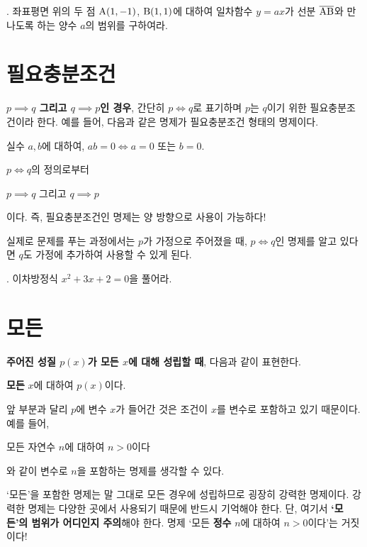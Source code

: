 \bigskip

\ex. 좌표평면 위의 두 점 \(\rm{A}(1, -1)\), \(\rm{B}(1, 1)\)에 대하여 일차함수 \(y = ax\)가 선분 \(\overline{\rm{AB}}\)와 만나도록 하는 양수 \(a\)의 범위를 구하여라.

\pagebreak

\section{필요충분조건}

\textbf{\(p \implies q\) 그리고 \(q \implies p\)인 경우}, 간단히 \(p \iff q\)로 표기하며 \(p\)는 \(q\)이기 위한 필요충분조건이라 한다. 예를 들어, 다음과 같은 명제가 필요충분조건 형태의 명제이다.
\begin{center}
    실수 \(a, b\)에 대하여, \(ab = 0 \iff a = 0\) 또는 \(b = 0\).
\end{center}

\(p \iff q\)의 정의로부터
\begin{center}
    \(p \implies q\) 그리고 \(q \implies p\)
\end{center}
이다. 즉, 필요충분조건인 명제는 양 방향으로 사용이 가능하다!

실제로 문제를 푸는 과정에서는 \(p\)가 가정으로 주어졌을 때, \(p \iff q\)인 명제를 알고 있다면 \(q\)도 가정에 추가하여 사용할 수 있게 된다.

\bigskip

\ex. 이차방정식 \(x^2 + 3x + 2 = 0\)을 풀어라.

\pagebreak

\section{모든}

\textbf{주어진 성질 \(p(x)\)가 모든 \(x\)에 대해 성립할 때}, 다음과 같이 표현한다.
\begin{center}
    \textbf{모든} \(x\)에 대하여 \(p(x)\)이다.
\end{center}
앞 부분과 달리 \(p\)에 변수 \(x\)가 들어간 것은 조건이 \(x\)를 변수로 포함하고 있기 때문이다. 예를 들어,
\begin{center}
    모든 자연수 \(n\)에 대하여 \(n > 0\)이다
\end{center}
와 같이 변수로 \(n\)을 포함하는 명제를 생각할 수 있다.

`모든'을 포함한 명제는 말 그대로 모든 경우에 성립하므로 굉장히 강력한 명제이다. 강력한 명제는 다양한 곳에서 사용되기 때문에 반드시 기억해야 한다. 단, 여기서 \textbf{`모든'의 범위가 어디인지 주의}해야 한다. 명제 `모든 \textbf{정수} \(n\)에 대하여 \(n > 0\)이다'는 거짓이다!

